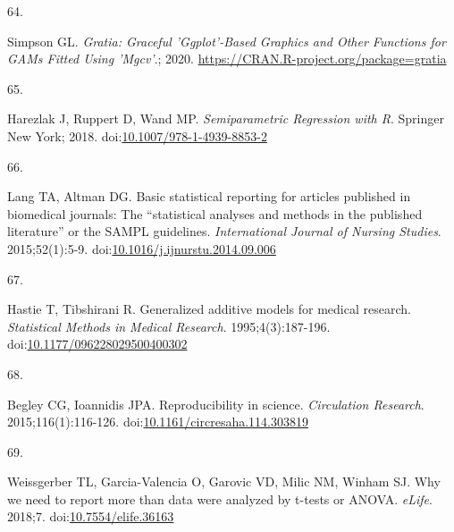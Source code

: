 \documentclass[
]{article}
\newlength{\cslhangindent}
\newlength{\csllabelwidth}
\newlength{\cslentryspacingunit} %
\newenvironment{CSLReferences}[2] %
 {%
  \setlength{\parindent}{0pt}
  \ifodd #1
  \let\oldpar\par
  \def\par{\hangindent=\cslhangindent\oldpar}
  \fi
  \setlength{\parskip}{#2\cslentryspacingunit}
 }%
 {}
\newcommand{\CSLLeftMargin}[1]{\parbox[t]{\csllabelwidth}{#1}}
\newcommand{\CSLRightInline}[1]{\parbox[t]{\linewidth - \csllabelwidth}{#1}\break}
\begin{document}
\begin{CSLReferences}{0}{0}
\leavevmode{}%
\CSLLeftMargin{64. }
\CSLRightInline{Simpson GL. \emph{Gratia: Graceful 'Ggplot'-Based Graphics and Other Functions for GAMs Fitted Using 'Mgcv'}.; 2020. \url{https://CRAN.R-project.org/package=gratia}}

\leavevmode{}%
\CSLLeftMargin{65. }
\CSLRightInline{Harezlak J, Ruppert D, Wand MP. \emph{Semiparametric Regression with {R}}. Springer New York; 2018. doi:\href{https://doi.org/10.1007/978-1-4939-8853-2}{10.1007/978-1-4939-8853-2}}

\leavevmode{}%
\CSLLeftMargin{66. }
\CSLRightInline{Lang TA, Altman DG. Basic statistical reporting for articles published in biomedical journals: The {``}statistical analyses and methods in the published literature{''} or the {SAMPL} guidelines. \emph{International Journal of Nursing Studies}. 2015;52(1):5-9. doi:\href{https://doi.org/10.1016/j.ijnurstu.2014.09.006}{10.1016/j.ijnurstu.2014.09.006}}

\leavevmode{}%
\CSLLeftMargin{67. }
\CSLRightInline{Hastie T, Tibshirani R. Generalized additive models for medical research. \emph{Statistical Methods in Medical Research}. 1995;4(3):187-196. doi:\href{https://doi.org/10.1177/096228029500400302}{10.1177/096228029500400302}}

\leavevmode{}%
\CSLLeftMargin{68. }
\CSLRightInline{Begley CG, Ioannidis JPA. Reproducibility in science. \emph{Circulation Research}. 2015;116(1):116-126. doi:\href{https://doi.org/10.1161/circresaha.114.303819}{10.1161/circresaha.114.303819}}

\leavevmode{}%
\CSLLeftMargin{69. }
\CSLRightInline{Weissgerber TL, Garcia-Valencia O, Garovic VD, Milic NM, Winham SJ. Why we need to report more than {\textquotesingle}data were analyzed by t-tests or {ANOVA}{\textquotesingle}. \emph{{eLife}}. 2018;7. doi:\href{https://doi.org/10.7554/elife.36163}{10.7554/elife.36163}}

\end{CSLReferences}
\end{document}
